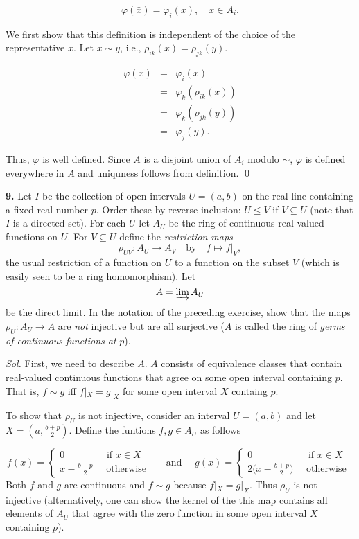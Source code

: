 \documentclass{article}
\theoremstyle{definition}
\theoremstyle{remark}
\begin{document}
\begin{enumerate}[(a)]
        $$\varphi(\bar{x}) = \varphi_i(x),\quad x \in A_i.$$
    
    We first show that this definition is independent of the choice of the representative $x$. Let $x \sim y$, i.e., $\rho_{ik}(x) = \rho_{jk}(y)$. 

    \begin{eqnarray*}
        \varphi(\bar{x}) & = & \varphi_i(x)\\
        & = & \varphi_k(\rho_{ik}(x)) \\
        & = & \varphi_k(\rho_{jk}(y))\\
        & = & \varphi_j(y).
    \end{eqnarray*}

    Thus, $\varphi$ is well defined. Since $A$ is a disjoint union of $A_i$ modulo $\sim$, $\varphi$ is defined everywhere in $A$ and uniquness follows from definition. \qed
\end{enumerate} 
\noindent
\textbf{9.} Let $I$ be the collection of open intervals $U = (a, b)$ on the real line containing a fixed real number $p$. Order these by reverse inclusion: $U \leq V$ if $V \subseteq U$ (note that $I$ is a directed set). For each $U$ let $A_U$ be the ring of continuous real valued functions on $U$. For $V \subseteq U$ define the \emph{restriction maps} 
\[
\rho_{UV} : A_U \to A_V \quad \text{by} \quad f \mapsto f|_V,
\]
the usual restriction of a function on $U$ to a function on the subset $V$ (which is easily seen to be a ring homomorphism). Let
\[
A = \varinjlim A_U
\]
be the direct limit. In the notation of the preceding exercise, show that the maps $\rho_U : A_U \to A$ are \emph{not} injective but are all surjective ($A$ is called the ring of \emph{germs of continuous functions at} $p$).

\textit{ Sol. } First, we need to describe $A$. $A$ consists of equivalence classes that contain real-valued continuous functions that agree on some open interval containing $p$. That is, $f \sim g$ iff $f|_X = g|_X$ for some open interval $X$ containg $p$.

To show that $\rho_U$ is not injective, consider an interval $U = (a, b)$ and let $X = (a, \frac{b + p}{2})$. Define the funtions $f, g \in A_U$ as follows

$$
f(x) = \begin{cases}
    0 \quad \quad \quad \quad \text{ if } x \in X \\
    x - \frac{b + p}2 \quad \text{ otherwise }
\end{cases}
\quad 
\text{ and }
\quad
g(x) = \begin{cases}
    0 \quad \quad \quad \quad \quad \ \  \text{ if } x \in X \\
    2\big(x - \frac{b + p}2\big) \quad \text{ otherwise }
\end{cases}
$$
Both $f$ and $g$ are continuous and $f \sim g$ because $f|_X = g|_X.$ Thus $\rho_U$ is not injective (alternatively, one can show the kernel of the this map contains all elements of $A_U$ that agree with the zero function in some open interval $X$ containing $p$).
\end{document}
